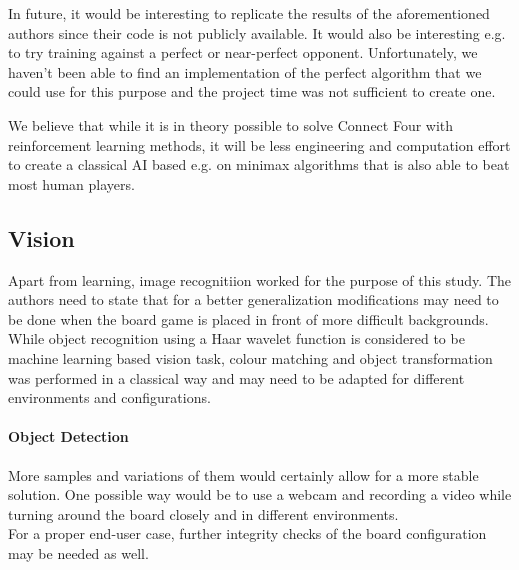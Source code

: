 \documentclass[10pt,twocolumn,letterpaper]{article}
\begin{document}
In future, it would be interesting to replicate the results of the aforementioned
authors since their code is not publicly available.
It would also be interesting e.g. to try training against a perfect or near-perfect opponent.
Unfortunately, we haven't been able to find an implementation of the perfect algorithm that we could use for this purpose and the project time was not sufficient to create one.

We believe that while it is in theory possible to solve Connect Four with
reinforcement learning methods, it will be less engineering and computation
effort to create a classical AI based e.g. on minimax algorithms that is also
able to beat most human players.

\subsection{Vision}
Apart from learning, image recognitiion worked for the purpose of this study.
The authors need to state that for a better generalization modifications may need to be done when the board game is placed in front of more difficult backgrounds.
While object recognition using a Haar wavelet function is considered to be machine learning based vision task, colour matching and object transformation was performed in a classical way and may need to be adapted for different environments and configurations.
\paragraph{Object Detection}
More samples and variations of them would certainly allow for a more stable solution. 
One possible way would be to use a webcam and recording a video while turning around the board closely and in different environments.\\
For a proper end-user case, further integrity checks of the board configuration may be needed as well.


{\small
\printbibliography
}
\end{document}
